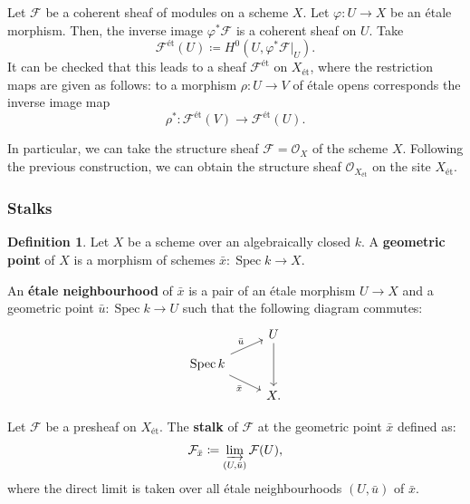 \documentclass{report}
\DeclareMathOperator{\Spec}{Spec}
\theoremstyle{definition}
\newtheorem{definition}[equation]{Definition}
\begin{document}
Let $\mathcal{F}$ be a coherent sheaf of modules on a scheme $X$. Let $\varphi:U\rightarrow X$ be an \'{e}tale morphism. Then, the inverse image $\varphi^*\mathcal{F}$ is a coherent sheaf on $U$. Take
\[\mathcal{F}^{\text{\'{e}t}}(U)\coloneqq H^0(U,\varphi^*\mathcal{F}|_U).\]
It can be checked that this leads to a sheaf $\mathcal{F}^{\text{\'{e}t}}$ on $X_{\text{\'{e}t}}$, where the restriction maps are given as follows: to a morphism $\rho:U\rightarrow V$ of \'{e}tale opens corresponds the inverse image map
\[\rho^*:\mathcal{F}^{\text{\'{e}t}}(V)\longrightarrow\mathcal{F}^{\text{\'{e}t}}(U).\]

In particular, we can take the structure sheaf $\mathcal{F}=\mathcal{O}_X$ of the scheme $X$. Following the previous construction, we can obtain the structure sheaf $\mathcal{O}_{X_{\text{\'{e}t}}}$ on the site $X_{\text{\'{e}t}}$.

\subsubsection*{Stalks}

\begin{definition}
Let $X$ be a scheme over an algebraically closed $k$. A \textbf{geometric point} of $X$ is a morphism of schemes $\bar{x}:\Spec k\rightarrow X$.

An \textbf{\'{e}tale neighbourhood} of $\bar{x}$ is a pair of an \'{e}tale morphism $U\rightarrow X$ and a geometric point $\bar{u}:\Spec k\rightarrow U$ such that the following diagram commutes:
\[
\begin{tikzcd}[row sep=small]
&U\arrow[dd]\\
\Spec k\arrow[ru,"\bar{u}"]\arrow[rd,swap,"\bar{x}"]\\
&X.
\end{tikzcd}
\]

Let $\mathcal{F}$ be a presheaf on $X_{\text{\'{e}t}}$. The \textbf{stalk} of $\mathcal{F}$ at the geometric point $\bar{x}$ defined as:
\[\mathcal{F}_{\bar{x}}\coloneqq\varinjlim_{(U,\bar{u})}\mathcal{F}(U),\]
where the direct limit is taken over all \'{e}tale neighbourhoods $(U,\bar{u})$ of $\bar{x}$.
\end{definition}
\end{document}
